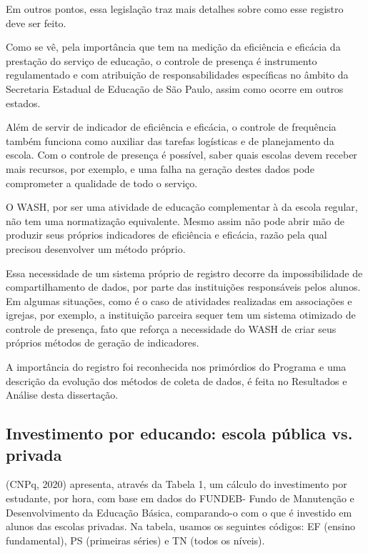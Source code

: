Em outros pontos, essa legislação traz mais detalhes sobre como esse registro deve ser feito.

Como se vê, pela importância que tem na medição da eficiência e eficácia da prestação do serviço de educação, o controle de presença é instrumento regulamentado e com atribuição de responsabilidades específicas no âmbito da Secretaria Estadual de Educação de São Paulo, assim como ocorre em outros estados.

Além de servir de indicador de eficiência e eficácia, o controle de frequência também funciona como auxiliar das tarefas logísticas e de planejamento da escola. Com o controle de presença é possível, saber quais escolas devem receber mais recursos, por exemplo, e uma falha na geração destes dados pode comprometer a qualidade de todo o serviço.

O WASH, por ser uma atividade de educação complementar à da escola regular, não tem uma normatização equivalente. Mesmo assim não pode abrir mão de produzir seus próprios indicadores de eficiência e eficácia, razão pela qual precisou desenvolver um método próprio.

Essa necessidade de um sistema próprio de registro decorre da impossibilidade de compartilhamento de dados, por parte das instituições responsáveis pelos alunos. Em algumas situações, como é o caso de atividades realizadas em associações e igrejas, por exemplo, a instituição parceira sequer tem um sistema otimizado de controle de presença, fato que reforça a necessidade do WASH de criar seus próprios métodos de geração de indicadores.

A importância do registro foi reconhecida nos primórdios do Programa e uma descrição da evolução dos métodos de coleta de dados, é feita no Resultados e Análise desta dissertação.

\subsection[Investimento por educando: escola pública vs. privada]{Investimento por educando: escola pública vs. privada}\label{Investimento por educando: escola pública vs. privada}
(CNPq, 2020)  apresenta, através da Tabela 1, um cálculo do investimento por estudante, por hora, com base em dados do FUNDEB- Fundo de Manutenção e Desenvolvimento da Educação Básica, comparando-o com o que é investido em alunos das escolas privadas. Na tabela, usamos os seguintes códigos: EF (ensino fundamental), PS (primeiras séries) e TN (todos os níveis).





